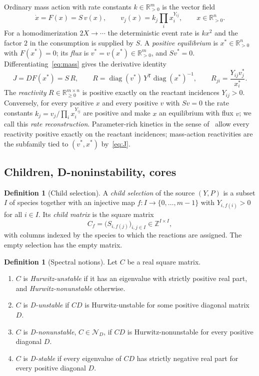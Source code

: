 \documentclass[11pt,a4paper]{article}
\theoremstyle{plain}
\theoremstyle{definition}
\newtheorem{definition}[theorem]{Definition}
\theoremstyle{remark}
\newcommand{\R}{\mathbb{R}}
\newcommand{\Z}{\mathbb{Z}}
\newcommand{\diag}{\operatorname{diag}}
\newcommand{\DN}{\mathcal{N}_D}
\newcommand{\xs}{x^{*}}
\newcommand{\vs}{v^{*}}
\begin{document}
Ordinary mass action with rate constants $k\in\R_{>0}^m$ is the vector field
\begin{equation}\label{eq:mass}
\dot x=F(x)=S\,v(x),\qquad v_j(x)=k_j\prod_{i}x_i^{Y_{ij}},\qquad x\in\R_{>0}^n .
\end{equation}
For a homodimerization $2X\to\cdots$ the deterministic event rate is $kx^2$ and the factor $2$ in the consumption is supplied by $S$. A \emph{positive equilibrium} is $\xs\in\R^n_{>0}$ with $F(\xs)=0$; its \emph{flux} is $\vs=v(\xs)\in\R^m_{>0}$, and $S\vs=0$. Differentiating~\eqref{eq:mass} gives the derivative identity
\begin{equation}\label{eq:J}
J=DF(\xs)=S\,R,\qquad R=\diag(\vs)\,Y^{\mathsf T}\diag(\xs)^{-1},\qquad R_{ji}=\frac{Y_{ij}v^*_j}{x^*_i}.
\end{equation}
The \emph{reactivity} $R\in\R^{m\times n}_{\ge0}$ is positive exactly on the reactant incidences $Y_{ij}>0$. Conversely, for every positive $x$ and every positive $v$ with $Sv=0$ the rate constants $k_j=v_j/\prod_ix_i^{Y_{ij}}$ are positive and make $x$ an equilibrium with flux $v$; we call this \emph{rate reconstruction}. Parameter-rich kinetics in the sense of~\cite{VassenaStadler2024} allow every reactivity positive exactly on the reactant incidences; mass-action reactivities are the subfamily tied to $(\vs,\xs)$ by~\eqref{eq:J}.

\subsection{Children, D-noninstability, cores}

\begin{definition}[Child selection]\label{def:child}
A \emph{child selection} of the source $(Y,P)$ is a subset $I$ of species together with an injective map $f\colon I\to\{0,\dots,m-1\}$ with $Y_{i,f(i)}>0$ for all $i\in I$. Its \emph{child matrix} is the square matrix
\[
C_f=\bigl(S_{i,f(j)}\bigr)_{i,j\in I}\in\Z^{I\times I},
\]
with columns indexed by the species to which the reactions are assigned. The empty selection has the empty matrix.
\end{definition}

\begin{definition}[Spectral notions]\label{def:spectral}
Let $C$ be a real square matrix.
\begin{enumerate}[label=(\alph*)]
\item $C$ is \emph{Hurwitz-unstable} if it has an eigenvalue with strictly positive real part, and \emph{Hurwitz-nonunstable} otherwise.
\item $C$ is \emph{D-unstable} if $CD$ is Hurwitz-unstable for some positive diagonal matrix $D$.
\item $C$ is \emph{D-nonunstable}, $C\in\DN$, if $CD$ is Hurwitz-nonunstable for every positive diagonal $D$.
\item $C$ is \emph{D-stable} if every eigenvalue of $CD$ has strictly negative real part for every positive diagonal $D$.
\end{enumerate}
\end{definition}
\end{document}

